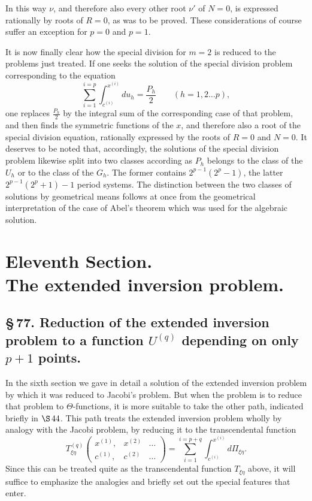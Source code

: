 \documentclass[10pt]{article}
\begin{document}
In this way \(\nu\), and therefore also every other root \(\nu'\) of \(N=0\), is expressed rationally by roots of \(R=0\), as was to be proved. These considerations of course suffer an exception for \(p=0\) and \(p=1\).

It is now finally clear how the special division for \(m=2\) is reduced to the problems just treated. If one seeks the solution of the special division problem corresponding to the equation
\[
\sum_{i=1}^{i=p}\int_{c^{(i)}}^{x^{(i)}}du_h=\frac{P_h}{2}
\qquad (h=1,2\ldots p),
\]
one replaces \(\frac{P_h}{2}\) by the integral sum of the corresponding case of that problem, and then finds the symmetric functions of the \(x\), and therefore also a root of the special division equation, rationally expressed by the roots of \(R=0\) and \(N=0\). It deserves to be noted that, accordingly, the solutions of the special division problem likewise split into two classes according as \(P_h\) belongs to the class of the \(U_h\) or to the class of the \(G_h\). The former contains \(2^{p-1}(2^p-1)\), the latter \(2^{p-1}(2^p+1)-1\) period systems. The distinction between the two classes of solutions by geometrical means follows at once from the geometrical interpretation of the case of Abel's theorem which was used for the algebraic solution.


\section*{Eleventh Section.\\The extended inversion problem.}

\subsection*{\S\,77. Reduction of the extended inversion problem to a function \(U^{(q)}\) depending on only \(p+1\) points.}

In the sixth section we gave in detail a solution of the extended inversion problem by which it was reduced to Jacobi's problem. But when the problem is to reduce that problem to \(\Theta\)-functions, it is more suitable to take the other path, indicated briefly in \(\S\,44\). This path treats the extended inversion problem wholly by analogy with the Jacobi problem, by reducing it to the transcendental function
\[
T_{\xi\eta}^{(q)}
\begin{pmatrix}
x^{(1)},&x^{(2)}&\ldots\\
c^{(1)},&c^{(2)}&\ldots
\end{pmatrix}
=\sum_{i=1}^{i=p+q}\int_{c^{(i)}}^{x^{(i)}}d\Pi_{\xi\eta}.
\]
Since this can be treated quite as the transcendental function \(T_{\xi\eta}\) above, it will suffice to emphasize the analogies and briefly set out the special features that enter.
\end{document}
